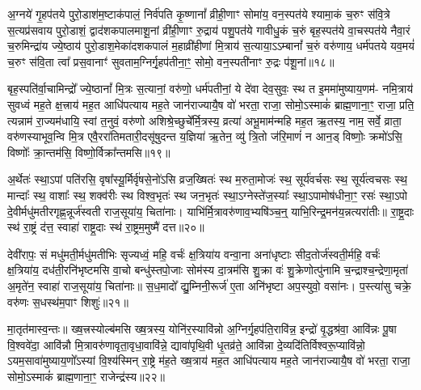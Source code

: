 अ॒ग्नये॑ गृ॒हप॑तये पुरो॒डाश॑म॒ष्टाक॑पालं॒ निर्व॑पति कृ॒ष्णानां᳚ व्रीही॒णाꣳ सोमा॑य॒ वन॒स्पत॑ये श्यामा॒कं च॒रुꣳ स॑वि॒त्रे स॒त्यप्र॑सवाय पुरो॒डाशं॒ द्वाद॑शकपालमाशू॒नां व्री॑ही॒णाꣳ रु॒द्राय॑ पशु॒पत॑ये गावीधु॒कं च॒रुं बृह॒स्पत॑ये वा॒चस्पत॑ये नैवा॒रं च॒रुमिन्द्रा॑य ज्ये॒ष्ठाय॑ पुरो॒डाश॒मेका॑दशकपालं म॒हाव्री॑हीणां मि॒त्राय॑ स॒त्याया॒\-ऽ\-ऽम्बानां᳚ च॒रुं वरु॑णाय॒ धर्म॑पतये यव॒मयं॑ च॒रुꣳ स॑वि॒ता त्वा᳚ प्रस॒वानाꣳ॑ सुवताम॒ग्निर्गृ॒हप॑तीना॒ꣳ॒ सोमो॒ वन॒स्पती॑नाꣳ रु॒द्रः प॑शू॒नां॥१८॥

बृह॒स्पति॑र्वा॒चामिन्द्रो᳚ ज्ये॒ष्ठानां᳚ मि॒त्रः स॒त्यानां॒ वरु॑णो॒ धर्म॑पतीनां॒ ये दे॑वा देव॒सुवः॒ स्थ त इ॒ममा॑मुष्याय॒णम॑- नमि॒त्राय॑ सुवध्वं मह॒ते क्ष॒त्त्राय॑ मह॒त आधि॑पत्याय मह॒ते जान॑राज्यायै॒ष वो॑ भरता॒ राजा॒ सोमो॒\-ऽस्माकं॑ ब्राह्म॒णाना॒ꣳ॒ राजा॒ प्रति॒ त्यन्नाम॑ रा॒ज्यम॑धायि॒ स्वां त॒नुवं॒ वरु॑णो अशिश्रे॒च्छुचे᳚र्मि॒त्रस्य॒ व्रत्या॑ अभू॒माम॑न्महि मह॒त ऋ॒तस्य॒ नाम॒ सर्वे॒ व्राता॒ वरु॑णस्याभूव॒न्वि मि॒त्र एवै॒ररा॑तिमतारी॒दसू॑षुदन्त य॒ज्ञिया॑ ऋ॒तेन॒ व्यु॑ त्रि॒तो ज॑रि॒माणं॑ न आन॒ड् विष्णोः॒ क्रमो॑\-ऽसि॒ विष्णोः᳚ क्रा॒न्तम॑सि॒ विष्णो॒र्विक्रा᳚न्तमसि॥१९॥

{\anuvakamend[{प॒शू॒नां व्राताः॒ पञ्च॑विꣳशतिश्च॥10॥}]}

अ॒र्थेतः॑ स्था॒\-ऽपां पति॑रसि॒ वृषा᳚स्यू॒र्मिर्वृ॑षसे॒नो॑\-ऽसि व्रज॒ख्षितः॑ स्थ म॒रुता॒मोजः॑ स्थ॒ सूर्य॑वर्चसः स्थ॒ सूर्य॑त्वचसः स्थ॒ मान्दाः᳚ स्थ॒ वाशाः᳚ स्थ॒ शक्व॑रीः स्थ विश्व॒भृतः॑ स्थ जन॒भृतः॑ स्था॒\-ऽग्नेस्ते॑ज॒स्याः᳚ स्था॒\-ऽपामोष॑धीना॒ꣳ॒ रसः॑ स्था॒\-ऽपो दे॒वीर्मधु॑मतीरगृह्ण॒न्नूर्ज॑स्वती राज॒सूया॑य॒ चिता॑नाः। याभि॑र्मि॒त्रावरु॑णाव॒भ्यषि॑ञ्च॒न्॒ याभि॒रिन्द्र॒मन॑य॒न्नत्यरा॑तीः॥ रा॒ष्ट्र॒दाः स्थ॑ रा॒ष्ट्रं द॑त्त॒ स्वाहा॑ राष्ट्र॒दाः स्थ॑ रा॒ष्ट्रम॒मुष्मै॑ दत्त॥२०॥

{\anuvakamend[{अत्येका॑दश च॥11॥}]}

देवी॑रापः॒ सं मधु॑मती॒र्मधु॑मतीभिः सृज्यध्वं॒ महि॒ वर्चः॑ क्ष॒त्रिया॑य वन्वा॒ना अना॑धृष्टाः सीद॒तोर्ज॑स्वती॒र्महि॒ वर्चः॑ क्ष॒त्रिया॑य॒ दध॑ती॒रनि॑भृष्टमसि वा॒चो बन्धु॑स्तपो॒जाः सोम॑स्य दा॒त्रम॑सि शु॒क्रा वः॑ शु॒क्रेणोत्पु॑नामि च॒न्द्राश्च॒न्द्रेणा॒मृता॑ अ॒मृते॑न॒ स्वाहा॑ राज॒सूया॑य॒ चिता॑नाः॥ स॒ध॒मादो᳚ द्यु॒म्निनी॒रूर्ज॑ ए॒ता अनि॑भृष्टा अप॒स्युवो॒ वसा॑नः। प॒स्त्या॑सु चक्रे॒ वरु॑णः स॒धस्थ॑म॒पाꣳ शिशुः॑॥२१॥

मा॒तृत॑मास्व॒न्तः॥ ख्ष॒त्त्रस्योल्ब॑मसि ख्ष॒त्रस्य॒ योनि॑र॒स्यावि॑न्नो अ॒ग्निर्गृ॒हप॑ति॒रावि॑न्न॒ इन्द्रो॑ वृ॒द्धश्र॑वा॒ आवि॑न्नः पू॒षा वि॒श्ववे॑दा॒ आवि॑न्नौ मि॒त्रावरु॑णावृता॒वृधा॒वावि॑न्ने॒ द्यावा॑पृथि॒वी धृ॒तव्र॑ते॒ आवि॑न्ना दे॒व्यदि॑तिर्विश्वरू॒प्यावि॑न्नो॒ \-ऽयम॒सावा॑मुष्याय॒णो᳚\-ऽस्यां वि॒श्य॑स्मिन् रा॒ष्ट्रे म॑ह॒ते ख्ष॒त्राय॑ मह॒त आधि॑पत्याय मह॒ते जान॑राज्यायै॒ष वो॑ भरता॒ राजा॒ सोमो॒\-ऽस्माकं॑ ब्राह्म॒णाना॒ꣳ॒ राजेन्द्र॑स्य॥२२॥

